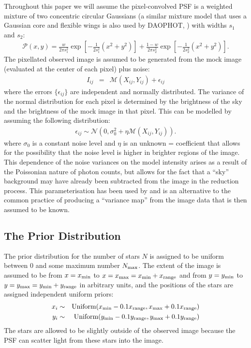 \documentclass[12pt, preprint]{aastex}
\begin{document}
Throughout this paper we will
assume the pixel-convolved PSF is a weighted mixture of two concentric
circular
Gaussians (a similar mixture model that uses a Gaussian core and flexible wings is also used by DAOPHOT, \citet{1987PASP...99..191S}) with widths
$s_1$ and $s_2$:
\begin{eqnarray}
\mathcal{P}(x, y) = \frac{w}{2\pi s_1^2}\exp
\left[
-\frac{1}{2s_1^2}\left(x^2 + y^2\right)
\right]
+ \frac{1-w}{2\pi s_2^2}\exp
\left[-\frac{1}{2s_2^2}\left(x^2 + y^2\right)
\right].
\end{eqnarray}
The pixellated observed image is assumed to be generated from the mock
image (evaluated at the center of each pixel) plus noise:
\begin{eqnarray}
I_{ij} &=& \mathcal{M}(X_{ij}, Y_{ij}) + \epsilon_{ij}
\end{eqnarray}
where the errors $\{\epsilon_{ij}\}$ are independent and normally distributed.
The variance of the normal distribution for each pixel is determined by the
brightness of the sky and the
brightness of the mock image in that pixel. This can be modelled by assuming the
following distribution:
\begin{eqnarray}
\epsilon_{ij} \sim \mathcal{N}(0, \sigma_0^2 + \eta \mathcal{M}(X_{ij}, Y_{ij})).
\end{eqnarray}
where $\sigma_0$ is a constant noise level and $\eta$ is an unknown = coefficient that allows for the possibility that
the noise level is higher in brighter regions of the image. This dependence of the
noise variances on the model intensity arises as a result of the Poissonian
nature of photon counts, but allows for the fact that a ``sky'' background may
have already been subtracted from the image in the reduction process.
This parameterisation has been used by \citet{2011MNRAS.412.2521B} and is an
alternative to the common practice of producing a ``variance map'' from the
image data that is then assumed to be known.

\subsection{The Prior Distribution}
The prior distribution for the number of stars $N$ is assigned to be uniform
between 0 and some maximum number $N_{\rm max}$. The extent of the image is
assumed to be from $x=x_{\rm min}$ to $x=x_{\rm max}=x_{\rm min} + x_{\rm range}$ and from
$y=y_{\rm min}$ to $y=y_{\rm max}=y_{\rm min} + y_{\rm range}$ in arbitrary units, and the
positions of the stars are assigned independent uniform priors:
\begin{eqnarray}
x_i &\sim& \textnormal{Uniform}(x_{\rm min} - 0.1x_{\rm range}, x_{\rm max} + 0.1x_{\rm range}) \\
y_i &\sim& \textnormal{Uniform}(y_{\rm min} - 0.1y_{\rm range}, y_{\rm max} + 0.1y_{\rm range})
\end{eqnarray}
The stars are allowed to be slightly outside of the observed image because the
PSF can scatter light from these stars into the image.
\end{document}

